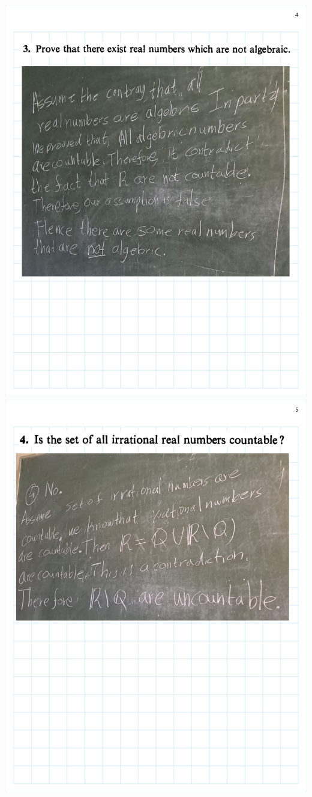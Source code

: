 \documentclass[
]{book}
\theoremstyle{definition}
\theoremstyle{definition}
\theoremstyle{definition}
\theoremstyle{definition}
\theoremstyle{remark}
\begin{document}
\includegraphics{Figures/Ex-2/Rudin Ch2-4.png}
\includegraphics{Figures/Ex-2/Rudin Ch2-5.png}
\end{document}
